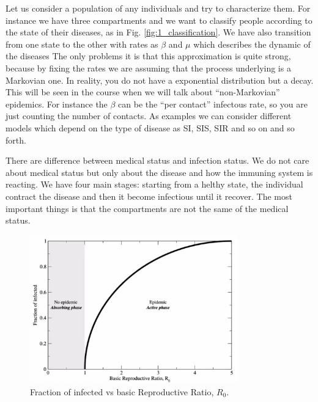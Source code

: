 \documentclass[../main/main.tex]{subfiles}
\begin{document}
Let us consider a population of any individuals and try to characterize them. For instance we have three compartments and we want to classify people according to the state of their diseases, as in Fig. \ref{fig:1_classification}. We have also transition from one state to the other with rates as \( \beta  \) and \( \mu  \) which describes the dynamic of the diseases
The only problems it is that this approximation is quite strong, because by fixing the rates we are assuming that the process underlying is a Markovian one. In reality, you do not have a exponential distribution but a decay. This will be seen in the course when we will talk about “non-Markovian” epidemics. For instance the \( \beta  \) can be the “per contact” infectous rate, so you are just counting the number of contacts.
As examples we can consider different models which depend on the type of disease as SI, SIS, SIR and so on and so forth.

There are difference between medical status and infection status. We do not care about medical status but only about the disease and how the immuning system is reacting. We have four main stages: starting from a helthy state, the individual contract the disease and then it become infectious until it recover. The most important things is that the compartments are not the same of the medical status.


\begin{figure}[t!]
\centering
\includegraphics[width=0.8\textwidth]{../lessons/image/2_R_0.png}
\caption{\label{fig:2_R_0.png} Fraction of infected vs basic Reproductive Ratio, \( R_0 \).}
\end{figure}
\end{document}
